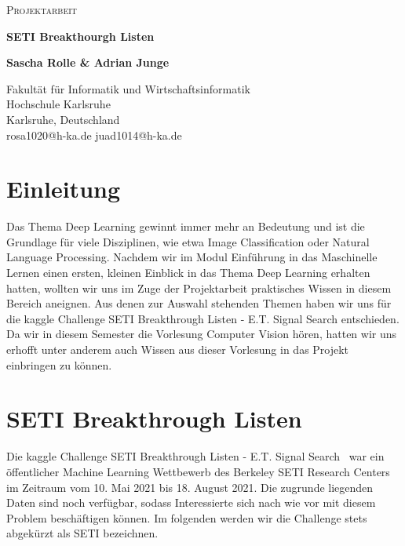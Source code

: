 \documentclass[12pt, a4paper]{article}
\begin{document}
\begin{titlepage}
		\begin{center}
			
			{\scshape\LARGE Projektarbeit \par}
			\vspace{1cm}
			{\huge\bfseries SETI Breakthourgh Listen \par}
			
			\vspace{1.5cm}
			\textbf{Sascha Rolle \& Adrian Junge}
			
			\vspace{4cm}
			\large
			Fakultät für Informatik und Wirtschaftsinformatik\\
			Hochschule Karlsruhe\\
			Karlsruhe, Deutschland\\
			rosa1020@h-ka.de
			juad1014@h-ka.de
		\end{center}
	\end{titlepage}

\tableofcontents
\thispagestyle{empty}
\newpage

\section{Einleitung}
\onehalfspacing
Das Thema Deep Learning gewinnt immer mehr an Bedeutung und ist die Grundlage für viele Disziplinen, wie etwa Image Classification oder Natural Language Processing. Nachdem wir im Modul Einführung in das Maschinelle Lernen einen ersten, kleinen Einblick in das Thema Deep Learning erhalten hatten, wollten wir uns im Zuge der Projektarbeit praktisches Wissen in diesem Bereich aneignen. Aus denen zur Auswahl stehenden Themen haben wir uns für die kaggle Challenge SETI Breakthrough Listen - E.T. Signal Search entschieden. Da wir in diesem Semester die Vorlesung Computer Vision hören, hatten wir uns erhofft unter anderem auch Wissen aus dieser Vorlesung in das Projekt einbringen zu können. 

\section{SETI Breakthrough Listen}
Die kaggle Challenge SETI Breakthrough Listen - E.T. Signal Search~\cite{o4} war ein öffentlicher Machine Learning Wettbewerb des Berkeley SETI Research Centers im Zeitraum vom 10. Mai 2021 bis 18. August 2021. Die zugrunde liegenden Daten sind noch verfügbar, sodass Interessierte sich nach wie vor mit diesem Problem beschäftigen können. Im folgenden werden wir die Challenge stets abgekürzt als SETI bezeichnen.
\end{document}
